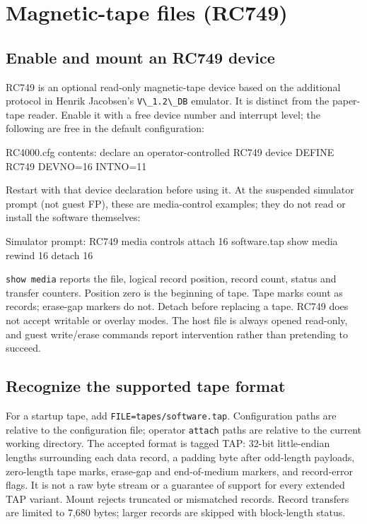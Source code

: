 \chapter{Magnetic-tape files (RC749)}\label{magnetic-tape-files-rc749}

\section{Enable and mount an RC749 device}\label{enable-and-mount-an-rc749-device}

RC749 is an optional read-only magnetic-tape device based on the additional protocol in Henrik Jacobsen's \passthrough{\lstinline!V\_1.2\_DB!} emulator. It is distinct from the paper-tape reader. Enable it with a free device number and interrupt level; the following are free in the default configuration:

\begin{commandexample}{RC4000.cfg contents: declare an operator-controlled RC749 device}
DEFINE RC749 DEVNO=16 INTNO=11
\end{commandexample}

Restart with that device declaration before using it. At the suspended simulator prompt (not guest FP), these are media-control examples; they do not read or install the software themselves:

\begin{commandexample}{Simulator prompt: RC749 media controls}
attach 16 software.tap
show media
rewind 16
detach 16
\end{commandexample}

\passthrough{\lstinline!show media!} reports the file, logical record position, record count, status and transfer counters. Position zero is the beginning of tape. Tape marks count as records; erase-gap markers do not. Detach before replacing a tape. RC749 does not accept writable or overlay modes. The host file is always opened read-only, and guest write/erase commands report intervention rather than pretending to succeed.

\section{Recognize the supported tape format}\label{recognize-the-supported-tape-format}

For a startup tape, add \passthrough{\lstinline!FILE=tapes/software.tap!}. Configuration paths are relative to the configuration file; operator \passthrough{\lstinline!attach!} paths are relative to the current working directory. The accepted format is tagged TAP: 32-bit little-endian lengths surrounding each data record, a padding byte after odd-length payloads, zero-length tape marks, erase-gap and end-of-medium markers, and record-error flags. It is not a raw byte stream or a guarantee of support for every extended TAP variant. Mount rejects truncated or mismatched records. Record transfers are limited to 7,680 bytes; larger records are skipped with block-length status.

